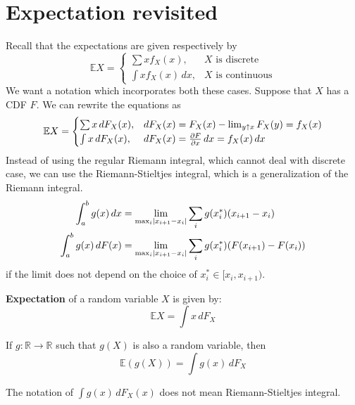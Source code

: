 \documentclass{huhtakm-template-book}
\newcommand{\expect}{\mathbb{E}}
\begin{document}
\section{Expectation revisited}
Recall that the expectations are given respectively by
\begin{equation*}
    \expect X=\begin{cases}
        \sum xf_{X}(x), &X\text{ is discrete}\\
        \int xf_{X}(x)\,dx, &X\text{ is continuous}
    \end{cases}
\end{equation*}
We want a notation which incorporates both these cases. Suppose that $X$ has a CDF $F$. We can rewrite the equations as
\begin{equation*}
    \expect X=\begin{cases}
        \sum x\,dF_{X}(x), &dF_{X}(x)=F_{X}(x)-\lim_{y\uparrow x}F_{X}(y)=f_{X}(x)\\
        \int x\,dF_{X}(x), &dF_{X}(x)=\pdv{F}{x}\,dx=f_{X}(x)\,dx
    \end{cases}
\end{equation*}
Instead of using the regular Riemann integral, which cannot deal with discrete case, we can use the Riemann-Stieltjes integral, which is a generalization of the Riemann integral.
\begin{align*}
    \int_{a}^{b}g(x)\,dx&=\lim_{\max_{i}\left|{x_{i+1}-x_{i}}\right|}\sum_{i}g(x_{i}^{*})(x_{i+1}-x_{i})\\
    \int_{a}^{b}g(x)\,dF(x)&=\lim_{\max_{i}\left|{x_{i+1}-x_{i}}\right|}\sum_{i}g(x_{i}^{*})(F(x_{i+1})-F(x_{i}))
\end{align*}
if the limit does not depend on the choice of $x_{i}^{*}\in[x_{i},x_{i+1})$.
\begin{defn}
    \textbf{Expectation} of a random variable $X$ is given by:
    \begin{equation*}
        \expect X=\int x\,dF_{X}
    \end{equation*}
\end{defn}
\begin{lem}
    If $g:\mathbb{R}\to\mathbb{R}$ such that $g(X)$ is also a random variable, then
    \begin{equation*}
        \expect(g(X))=\int g(x)\,dF_{X}
    \end{equation*}
\end{lem}
\begin{rem}
    The notation of $\int g(x)\,dF_{X}(x)$ does not mean Riemann-Stieltjes integral.
\end{rem}
\end{document}
